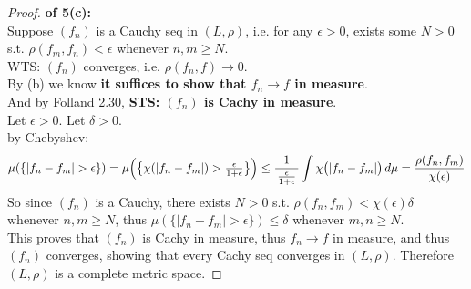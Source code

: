 \documentclass[lang=cn,11pt]{elegantbook}
\begin{document}
\begin{proof}
   \textbf{ of 5(c): }\\
   Suppose $(f_n)$ is a Cauchy seq in $(L,\rho)$, i.e. for any $\epsilon > 0$, exists some $N>0$ s.t. \(\rho(f_m, f_n)  < \epsilon\) whenever $n,m \geq N$.\\
   WTS: $(f_n)$ converges, i.e. $\rho(f_n,f)\to0$. \\
By (b) we know \textbf{it suffices to show that $f_n\to f$ in measure}.\\
And by Folland 2.30, \textbf{ STS: $(f_n)$ is Cachy in measure}.\\
Let $\epsilon > 0$. Let $\delta > 0$.\\
by Chebyshev:\[
 \mu(  \{|f_n-f_m| > \epsilon\} ) =    \mu\Bigl(\bigl\{\chi(|f_n-f_m|)>\tfrac{\epsilon}{1+\epsilon}\bigr\}\Bigr) \leq 
    \frac{1}{\,\tfrac{\epsilon}{1+\epsilon}\,}
    \int\chi\bigl(|f_n-f_m|\bigr)\,d\mu =  \frac{\rho(f_n,f_m)}{\chi(\epsilon)}
  \]
So since $(f_n)$ is a Cauchy, there exists $N > 0$ s.t. $\rho(f_n,f_m) < \chi(\epsilon) \delta$ whenever $n,m \geq N$, thus  $ \mu(  \{|f_n-f_m| > \epsilon\} ) \leq \delta$ whenever $m,n \geq N$.\\
This proves that $(f_n)$ is Cachy in measure, thus $f_n\to f$ in measure, and thus $(f_n)$ converges, showing that every Cachy seq converges in $(L,\rho)$. Therefore $(L,\rho)$ is a complete metric space. 
\end{proof}
\end{document}
